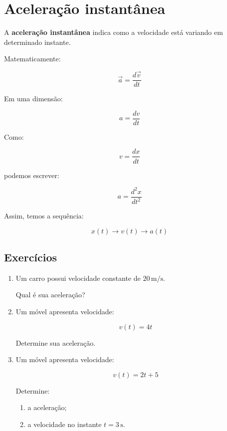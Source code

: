 \documentclass[a4paper,12pt]{article}
\begin{document}
\section{Aceleração instantânea}

\begin{ideia}

A \textbf{aceleração instantânea} indica como a velocidade está
variando em determinado instante.

Matematicamente:

\[
\boxed{
\vec a=
\frac{d\vec v}{dt}
}
\]

Em uma dimensão:

\[
\boxed{
a=
\frac{dv}{dt}
}
\]

Como:

\[
v=\frac{dx}{dt}
\]

podemos escrever:

\[
\boxed{
a=
\frac{d^2x}{dt^2}
}
\]

Assim, temos a sequência:

\[
\boxed{
x(t)
\longrightarrow
v(t)
\longrightarrow
a(t)
}
\]

\end{ideia}


\subsection*{Exercícios}

\begin{enumerate}

\item Um carro possui velocidade constante de
$20\,\text{m/s}$.

Qual é sua aceleração?

\vspace{1.5cm}


\item Um móvel apresenta velocidade:

\[
v(t)=4t
\]

Determine sua aceleração.

\vspace{1.5cm}


\item Um móvel apresenta velocidade:

\[
v(t)=2t+5
\]

Determine:

\begin{enumerate}
    \item a aceleração;
    \item a velocidade no instante $t=3\,\text{s}$.
\end{enumerate}

\vspace{1.5cm}

\end{enumerate}
\end{document}
